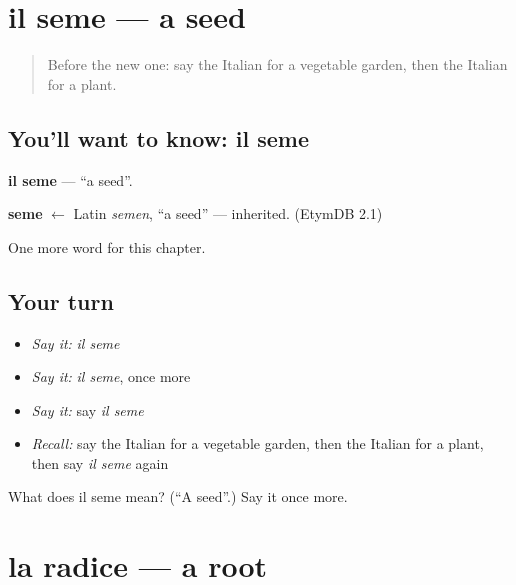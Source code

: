 \section[il seme]{il seme — a seed}

\label{lesson:IT-C168-seme}



\begin{quote}
Before the new one: say the Italian for a vegetable garden, then the Italian for a plant.
\end{quote}

\subsection*{You'll want to know: il seme}
\textbf{il seme} — \textquotedblleft{}a seed\textquotedblright{}.

\begin{cousinweb}
\textbf{seme} $\leftarrow$ Latin \emph{semen}, \textquotedblleft{}a seed\textquotedblright{} — inherited. (EtymDB 2.1)
\end{cousinweb}

\begin{grammarlens}[title={What you've built}]
One more word for this chapter.
\end{grammarlens}

\subsection*{Your turn}
\begin{itemize}
\raggedright
  \item \emph{Say it:} \emph{il seme}
  \item \emph{Say it:} \emph{il seme}, once more
  \item \emph{Say it:} say \emph{il seme}
  \item \emph{Recall:} say the Italian for a vegetable garden, then the Italian for a plant, then say \emph{il seme} again
\end{itemize}

\begin{tcolorbox}[breakable,colback=teal!4,colframe=teal!35!black,title={Before you move on}]
What does il seme mean? (\textquotedblleft{}A seed\textquotedblright{}.) Say it once more.
\end{tcolorbox}
\section[la radice]{la radice — a root}

